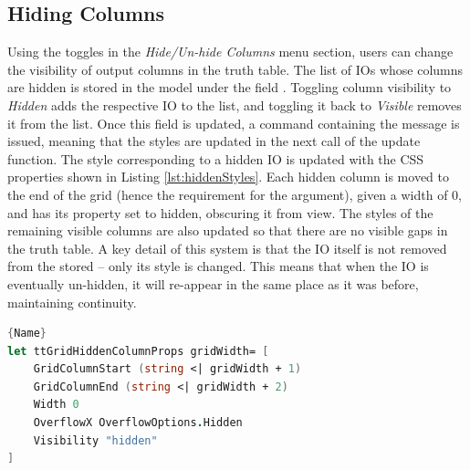 \subsection{Hiding Columns} \label{subsec:colhide}
Using the toggles in the \textit{Hide/Un-hide Columns} menu section, users can change the visibility of output columns in the truth table. The list of IOs whose columns are hidden is stored in the model under the field . Toggling column visibility to \textit{Hidden} adds the respective IO to the list, and toggling it back to \textit{Visible} removes it from the list. Once this field is updated, a command containing the message  is issued, meaning that the styles are updated in the next call of the update function. The style corresponding to a hidden IO is updated with the CSS properties shown in Listing \ref{lst:hiddenStyles}. Each hidden column is moved to the end of the grid (hence the requirement for the  argument), given a width of 0, and has its  property set to hidden, obscuring it from view. The styles of the remaining visible columns are also updated so that there are no visible gaps in the truth table. A key detail of this system is that the IO itself is not removed from the stored  -- only its style is changed. This means that when the IO is eventually un-hidden, it will re-appear in the same place as it was before, maintaining continuity.

\begin{lstlisting}[caption=Generating CSS Properties for a Hidden IO,frame=tlrb, language=FSharp, label=lst:hiddenStyles]{Name}
let ttGridHiddenColumnProps gridWidth= [
    GridColumnStart (string <| gridWidth + 1)
    GridColumnEnd (string <| gridWidth + 2)
    Width 0
    OverflowX OverflowOptions.Hidden
    Visibility "hidden"
]
\end{lstlisting}
